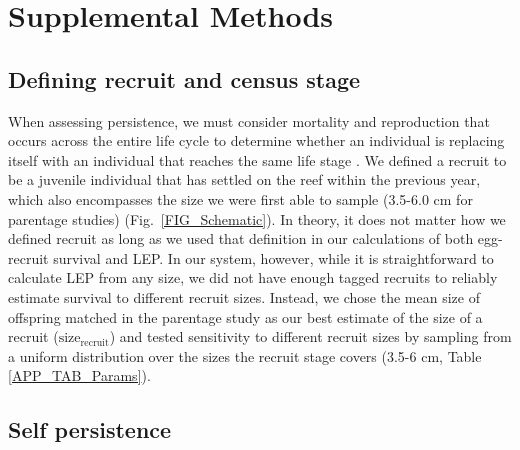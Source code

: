\documentclass[12pt, oneside]{article}   	%
\begin{document}
\appendix

\renewcommand{\theequation}{A\arabic{equation}}
\renewcommand{\thetable}{A\arabic{table}}
\setcounter{equation}{0}  %
\setcounter{figure}{0}
\setcounter{table}{0}

\section{Supplemental Methods} \label{APP_SUPP_METHODS}

\subsection{Defining recruit and census stage} \label{APP_SEC_METHODS_Recruit_def}

When assessing persistence, we must consider mortality and reproduction that occurs across the entire life cycle to determine whether an individual is replacing itself with an individual that reaches the same life stage \citep{burgess2014beyond}. We defined a recruit to be a juvenile individual that has settled on the reef within the previous year, which also encompasses the size we were first able to sample (3.5-6.0 cm for parentage studies) (Fig.\ \ref{FIG_Schematic}). In theory, it does not matter how we defined recruit as long as we used that definition in our calculations of both egg-recruit survival and LEP. In our system, however, while it is straightforward to calculate LEP from any size, we did not have enough tagged recruits to reliably estimate survival to different recruit sizes. Instead, we chose the mean size of offspring matched in the parentage study as our best estimate of the size of a recruit ($\text{size}_\text{recruit}$) and tested sensitivity to different recruit sizes by sampling from a uniform distribution over the sizes the recruit stage covers (3.5-6 cm, Table \ref{APP_TAB_Params}).

\subsection{Self persistence}
\end{document}
